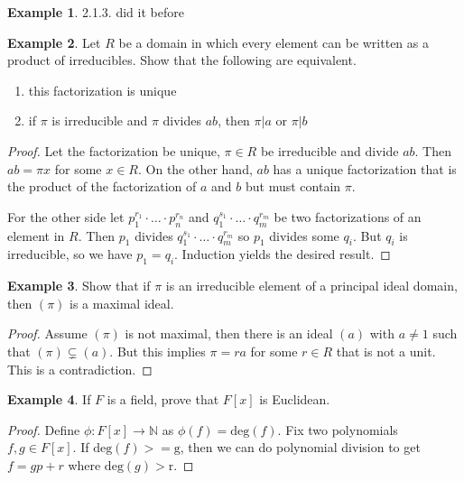 \documentclass[a4paper]{book}
\theoremstyle{definition}
\newtheorem{example}{Example}[definition]
\begin{document}
\begin{example}
    2.1.3. did it before
\end{example}

\begin{example}
    Let \(R\) be a domain in which every element can be written as a product of irreducibles. Show that the following are equivalent.
    \begin{enumerate}
        \item this factorization is unique
        \item if \(\pi\) is irreducible and \(\pi\) divides \(ab\), then \(\pi | a\) or \(\pi | b\)
    \end{enumerate}
\end{example}
\begin{proof}
    Let the factorization be unique, \(\pi \in R\) be irreducible and divide \(ab\). Then \(ab = \pi x\) for some \(x \in R\). On the other hand, \(ab\) has a unique factorization that is the product of the factorization of \(a\) and \(b\) but must contain \(\pi\).

    For the other side let \(p_1^{r_1} \cdot \ldots \cdot p_n^{r_n}\) and \(q_1^{s_1} \cdot \ldots \cdot q_m^{r_m}\) be two factorizations of an element in \(R\). Then \(p_1\) divides \(q_1^{s_1} \cdot \ldots \cdot q_m^{r_m}\) so \(p_1\) divides some \(q_i\). But \(q_i\) is irreducible, so we have \(p_1 = q_i\). Induction yields the desired result.
\end{proof}

\begin{example}
    Show that if \(\pi\) is an irreducible element of a principal ideal domain, then \((\pi)\) is a maximal ideal.
\end{example}
\begin{proof}
    Assume \((\pi)\) is not maximal, then there is an ideal \((a)\) with \(a \neq 1\) such that \((\pi) \subsetneq (a)\). But this implies \(\pi = r a\) for some \(r \in R\) that is not a unit. This is a contradiction.
\end{proof}

\begin{example}
    If \(F\) is a field, prove that \(F[x]\) is Euclidean.
\end{example}
\begin{proof}
    Define \(\phi: F[x] \longrightarrow \mathbb{N}\) as \(\phi(f) = \mathrm{deg}(f)\). Fix two polynomials \(f, g \in F[x]\). If \(\mathrm{deg}(f) >= \mathrm{g}\), then we can do polynomial division to get \(f = g p + r\) where \(\mathrm{deg}(g) > \mathrm{r}\).
\end{proof}
\end{document}
